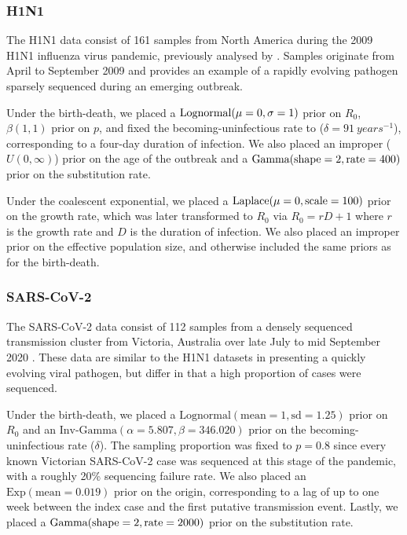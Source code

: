 \documentclass[12pt]{article}
\begin{document}
\begin{spacing}{2}
\subsubsection*{H1N1}
The H1N1 data consist of 161 samples from North America during the 2009 H1N1 influenza virus pandemic, previously analysed by \citet{hedge_2013_real-time}. Samples originate from April to September 2009 and provides an example of a rapidly evolving pathogen sparsely sequenced during an emerging outbreak. 

Under the birth-death, we placed a $\textnormal{Lognormal}(\mu=0,\sigma=1)$ prior on $R_0$, $\beta(1,1)$ prior on $p$, and fixed the becoming-uninfectious rate to ($\delta = 91\ years^{-1}$), corresponding to a four-day duration of infection. We also placed an improper ($U(0,\infty)$) prior on the age of the outbreak and a $\textnormal{Gamma}(\textnormal{shape}=2,\textnormal{rate}=400)$ prior on the substitution rate.

Under the coalescent exponential, we placed a $\textnormal{Laplace}(\mu=0,\textnormal{scale}=100)$ prior on the growth rate, which was later transformed to $R_0$ via $R_0 = rD+1$ where $r$ is the growth rate and $D$ is the duration of infection. We also placed an improper prior on the effective population size, and otherwise included the same priors as for the birth-death.

\subsubsection*{SARS-CoV-2}
The SARS-CoV-2 data consist of 112 samples from a densely sequenced transmission cluster from Victoria, Australia over late July to mid September 2020 \citet{lane2021genomics}. These data are similar to the H1N1 datasets in presenting a quickly evolving viral pathogen, but differ in that a high proportion of cases were sequenced.

Under the birth-death, we placed a $\textrm{Lognormal}(\textrm{mean}=1, \textrm{sd}=1.25)$ prior on $R_0$ and an $\textrm{Inv-Gamma}(\alpha=5.807, \beta=346.020)$ prior on the becoming-uninfectious rate ($\delta$). The sampling proportion was fixed to $p=0.8$ since every known Victorian SARS-CoV-2 case was sequenced at this stage of the pandemic, with a roughly 20\% sequencing failure rate. We also placed an $\textrm{Exp}(\textrm{mean}=0.019)$ prior on the origin, corresponding to a lag of up to one week  between the index case and the first putative transmission event. Lastly, we placed a $\textnormal{Gamma}(\textnormal{shape}=2,\textnormal{rate}=2000)$ prior on the substitution rate.


\end{spacing}
\end{document}
